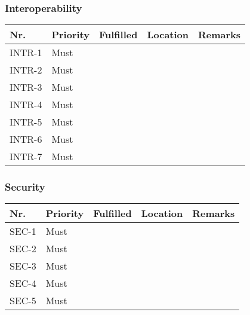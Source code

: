 \subsubsection{Interoperability}
\begin{table}[H]
	\begin{tabular}{lllll}
						    
		Nr.    & Priority & Fulfilled & Location & Remarks \\ \hline
		INTR-1 & Must     & ~        & ~         & ~       \\ 
		INTR-2 & Must     & ~        & ~         & ~       \\ 
		INTR-3 & Must     & ~        & ~         & ~       \\ 
		INTR-4 & Must     & ~        & ~         & ~       \\ 
		INTR-5 & Must     & ~        & ~         & ~       \\ 
		INTR-6 & Must     & ~        & ~         & ~       \\ 
		INTR-7 & Must     & ~        & ~         & ~       \\
						
	\end{tabular}
\end{table}

\subsubsection{Security}
\begin{table}[H]
	\begin{tabular}{lllll}
						    
		Nr.   & Priority & Fulfilled & Location & Remarks \\ \hline
		SEC-1 & Must     & ~        & ~         & ~       \\ 
		SEC-2 & Must     & ~        & ~         & ~       \\ 
		SEC-3 & Must     & ~        & ~         & ~       \\ 
		SEC-4 & Must     & ~        & ~         & ~       \\ 
		SEC-5 & Must     & ~        & ~         & ~       \\
						
	\end{tabular}
\end{table}


